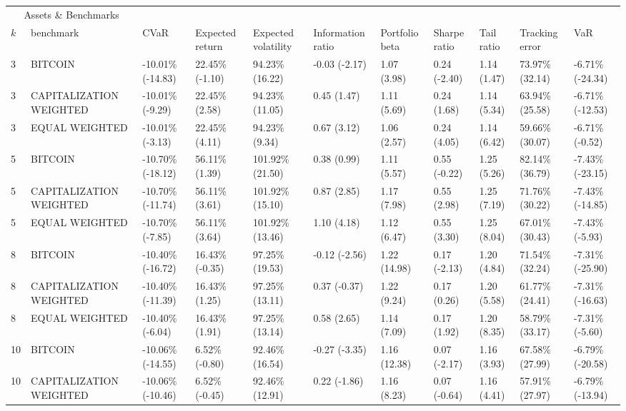\documentclass{article}
\begin{document}
\begin{landscape}
\begin{table}[H]
  \centering
  \begin{tabular}{p{0.4cm}|p{3cm}|p{1.65cm}|p{1.65cm}|p{1.65cm}|p{1.65cm}|p{1.65cm}|p{1.65cm}|p{1.65cm}|p{1.65cm}|p{1.65cm}}%
    \toprule
    \multicolumn{2}{c}{Assets \& Benchmarks}                   \\
    \cmidrule(r){1-2}
    $k$ & benchmark & CVaR & Expected return & Expected volatility&Information ratio&Portfolio beta&Sharpe ratio&Tail ratio&Tracking error&VaR\\
    \midrule 
3&BITCOIN&-10.01\% (-14.83)&22.45\% (-1.10)&94.23\% (16.22)&-0.03 (-2.17)&1.07 (3.98)&0.24 (-2.40)&1.14 (1.47)&73.97\% (32.14)&-6.71\% (-24.34)
\\ 
3&CAPITALIZATION WEIGHTED&-10.01\% (-9.29)&22.45\% (2.58)&94.23\% (11.05)&0.45 (1.47)&1.11 (5.69)&0.24 (1.68)&1.14 (5.34)&63.94\% (25.58)&-6.71\% (-12.53)
\\ 
3&EQUAL WEIGHTED&-10.01\% (-3.13)&22.45\% (4.11)&94.23\% (9.34)&0.67 (3.12)&1.06 (2.57)&0.24 (4.05)&1.14 (6.42)&59.66\% (30.07)&-6.71\% (-0.52)
\\ 
5&BITCOIN&-10.70\% (-18.12)&56.11\% (1.39)&101.92\% (21.50)&0.38 (0.99)&1.11 (5.57)&0.55 (-0.22)&1.25 (5.26)&82.14\% (36.79)&-7.43\% (-23.15)
\\ 
5&CAPITALIZATION WEIGHTED&-10.70\% (-11.74)&56.11\% (3.61)&101.92\% (15.10)&0.87 (2.85)&1.17 (7.98)&0.55 (2.98)&1.25 (7.19)&71.76\% (30.22)&-7.43\% (-14.85)
\\ 
5&EQUAL WEIGHTED&-10.70\% (-7.85)&56.11\% (3.64)&101.92\% (13.46)&1.10 (4.18)&1.12 (6.47)&0.55 (3.30)&1.25 (8.04)&67.01\% (30.43)&-7.43\% (-5.93)
\\ 
8&BITCOIN&-10.40\% (-16.72)&16.43\% (-0.35)&97.25\% (19.53)&-0.12 (-2.56)&1.22 (14.98)&0.17 (-2.13)&1.20 (4.84)&71.54\% (32.24)&-7.31\% (-25.90)
\\ 
8&CAPITALIZATION WEIGHTED&-10.40\% (-11.39)&16.43\% (1.25)&97.25\% (13.11)&0.37 (-0.37)&1.22 (9.24)&0.17 (0.26)&1.20 (5.58)&61.77\% (24.41)&-7.31\% (-16.63)
\\ 
8&EQUAL WEIGHTED&-10.40\% (-6.04)&16.43\% (1.91)&97.25\% (13.14)&0.58 (2.65)&1.14 (7.09)&0.17 (1.92)&1.20 (8.35)&58.79\% (33.17)&-7.31\% (-5.60)
\\ 
10&BITCOIN&-10.06\% (-14.55)&6.52\% (-0.80)&92.46\% (16.54)&-0.27 (-3.35)&1.16 (12.38)&0.07 (-2.17)&1.16 (3.93)&67.58\% (27.99)&-6.79\% (-20.58)
\\ 
10&CAPITALIZATION WEIGHTED&-10.06\% (-10.46)&6.52\% (-0.45)&92.46\% (12.91)&0.22 (-1.86)&1.16 (8.23)&0.07 (-0.64)&1.16 (4.41)&57.91\% (27.97)&-6.79\% (-13.94)

\end{tabular}
\end{table}
\end{landscape}
\end{document}
